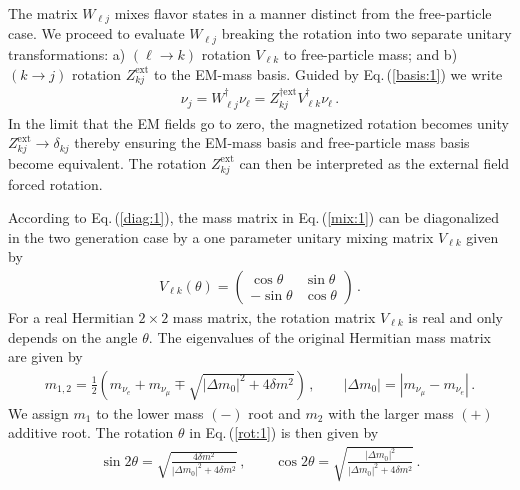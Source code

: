\documentclass{ws-ijmpa}
\newcommand{\req}[1]{Eq.\,(\ref{#1})}
\begin{document}
The matrix $W_{\ell j}$ mixes flavor states in a manner distinct from the free-particle case. We proceed to evaluate $W_{\ell j}$ breaking the rotation into two separate unitary transformations: a) $(\ell\rightarrow k)$ rotation $V_{\ell k}$ to free-particle mass; and b) $(k\rightarrow j)$ rotation $Z_{kj}^\mathrm{ext}$ to the EM-mass basis. Guided by \req{basis:1} we write
\begin{align}
\label{zrot:1}
\nu_{j} = W^{\dag}_{\ell j}\nu_{\ell} = Z_{kj}^{\dag\mathrm{ext}}V_{\ell k}^{\dag}\nu_{\ell}\,.
\end{align}
In the limit that the EM fields go to zero, the magnetized rotation becomes unity $Z_{kj}^\mathrm{ext}\rightarrow\delta_{kj}$ thereby ensuring the EM-mass basis and free-particle mass basis become equivalent. The rotation $Z_{kj}^\mathrm{ext}$ can then be interpreted as the external field forced rotation.

According to \req{diag:1}, the mass matrix in \req{mix:1} can be diagonalized in the two generation case by a one parameter unitary mixing matrix $V_{\ell k}$ given by
\begin{align}
\label{rot:1}
V_{\ell k}(\theta)=
\begin{pmatrix}
\cos\theta & \sin\theta\\
-\sin\theta & \cos\theta
\end{pmatrix}\,.
\end{align}
For a real Hermitian $2\times 2$ mass matrix, the rotation matrix $V_{\ell k}$ is real and only depends on the angle $\theta$. The eigenvalues of the original Hermitian mass matrix are given by
\begin{align}
\label{massroot:1}
m_{1,2}=\frac{1}{2}\left(m_{\nu_{e}}+m_{\nu_{\mu}}\mp\sqrt{|\Delta m_{0}|^{2}+4\delta m^{2}}\right)\,,\qquad
|\Delta m_{0}|=|m_{\nu_{\mu}}-m_{\nu_{e}}|\,.
\end{align}
We assign $m_{1}$ to the lower mass $(-)$ root and $m_{2}$ with the larger mass $(+)$ additive root. The rotation $\theta$ in \req{rot:1} is then given by
\begin{align}
\label{massroot:2}
\sin2\theta=\sqrt{\frac{4\delta m^{2}}{|\Delta m_{0}|^{2}+4\delta m^{2}}}\,,\qquad
\cos2\theta=\sqrt{\frac{|\Delta m_{0}|^{2}}{|\Delta m_{0}|^{2}+4\delta m^{2}}}\,.
\end{align}
\end{document}
